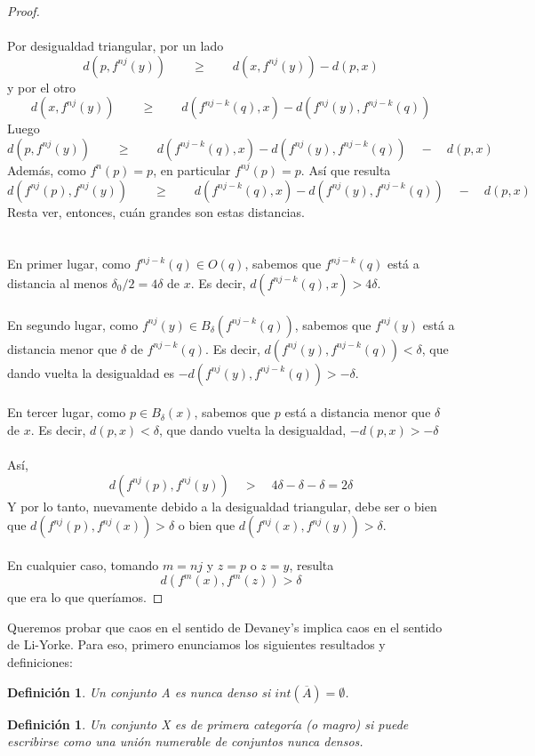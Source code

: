 \documentclass[12pt,a4paper]{article}
\newtheorem{definition}[theorem]{Definición}
\begin{document}
\begin{proof}
\\
\\
Por desigualdad triangular, por un lado
\[
d(p,f^{nj}(y)) \qquad \geq \qquad d(x,f^{nj}(y)) - d(p,x)
\]
y por el otro
\[
d(x,f^{nj}(y)) \qquad \geq \qquad d(f^{nj-k}(q), x) - d(f^{nj}(y), f^{nj-k}(q))
\]
Luego
\[
d(p,f^{nj}(y)) \qquad \geq \qquad d(f^{nj-k}(q), x) - d(f^{nj}(y), f^{nj-k}(q)) \quad - \quad  d(p,x)
\]
Además, como $f^n(p)=p$, en particular $f^{nj}(p) = p$. Así que resulta
\[
d(f^{nj}(p),f^{nj}(y)) \qquad \geq \qquad d(f^{nj-k}(q), x) - d(f^{nj}(y), f^{nj-k}(q)) \quad - \quad  d(p,x)
\]
Resta ver, entonces, cuán grandes son estas distancias.
\\
\\
\\
En primer lugar, como $f^{nj-k}(q) \in O(q)$, sabemos que $f^{nj-k}(q)$ está a distancia al menos $\delta_0/2 = 4\delta$ de $x$. Es decir, $d(f^{nj-k}(q), x) > 4\delta$.
\\
\\
En segundo lugar, como $f^{nj}(y) \in B_\delta(f^{nj-k}(q))$, sabemos que $f^{nj}(y)$ está a distancia menor que $\delta$ de $f^{nj-k}(q)$. Es decir, $d(f^{nj}(y), f^{nj-k}(q)) < \delta$, que dando vuelta la desigualdad es $-d(f^{nj}(y), f^{nj-k}(q)) > -\delta$.
\\
\\
En tercer lugar, como $p \in B_\delta(x)$, sabemos que $p$ está a distancia menor que $\delta$ de $x$. Es decir, $d(p,x) < \delta$, que dando vuelta la desigualdad, $-d(p,x) > -\delta$
\\
\\
Así,
\[
d(f^{nj}(p),f^{nj}(y)) \quad > \quad 4\delta - \delta - \delta = 2\delta
\]
Y por lo tanto, nuevamente debido a la desigualdad triangular, debe ser o bien que $d(f^{nj}(p),f^{nj}(x)) > \delta$ o bien que $d(f^{nj}(x),f^{nj}(y)) > \delta$.
\\
\\
En cualquier caso, tomando $m=nj$ y $z = p$ o $z = y$, resulta
\[
d(f^m(x), f^m(z)) > \delta
\]
que era lo que queríamos.
\end{proof}
Queremos probar que caos en el sentido de Devaney's implica caos en el sentido de Li-Yorke. Para eso, primero enunciamos los siguientes resultados y definiciones:
\begin{definition}
    Un conjunto A es nunca denso si $int(\overline{A}) = \emptyset$.
\end{definition}
\begin{definition}
    Un conjunto X es de primera categoría (o magro) si puede escribirse como una unión numerable de conjuntos nunca densos.
\end{definition}
\end{document}
